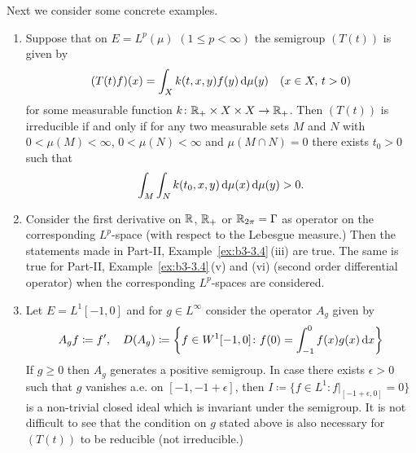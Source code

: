 Next we consider some concrete examples.
\begin{examples}\label{ex:c3-3.4}
	\begin{enumerate}[\upshape (i), wide, labelindent=.25em]
	\item 
	Suppose that on $E = L^{p}(\mu)$ $(1 \leq p < \infty)$ the semigroup $(T(t))$ is given by
	\begin{equation}\label{eq:c3-3.1}
		(T(t)f)(x) = \int_{X} k(t,x,y)f(y) \mathop{}\!\mathrm{d}{\mu}(y) \quad (x \in X,\, t > 0)
	\end{equation}
	for some measurable function $k \colon \mathbb{R} _{+} \times X \times X \to \mathbb{R} _{+}$.
	Then $(T(t))$ is irreducible if and only if for any two measurable sets $M$ and $N$ with $0 < \mu(M) < \infty$, $0 < \mu(N) < \infty$ and $\mu(M\cap N) = 0$ there exists $t_{0} > 0$ such that 
\[
	\int_{M}\int_{N} k(t_{0},x,y)\mathop{}\!\mathrm{d}{\mu}(x)\mathop{}\!\mathrm{d}{\mu}(y) > 0 .
\]
%
	\item 
	Consider the first derivative on $\mathbb{R} $, $\mathbb{R} _{+}$ or $\mathbb{R} _{2\pi} = \Gamma$ as operator on the corresponding $L^{p}$-space (with respect to the Lebesgue measure.)
	Then the statements made in Part-II, Example~\ref{ex:b3-3.4}\,(iii) are true.
	The same is true for Part-II, Example~\ref{ex:b3-3.4}\,(v) and (vi) (second order differential operator) when the corresponding $L^{p}$-spaces are considered.
	
	\item 
	Let $E = L^{1}[-1,0]$ and for $g \in L^{\infty}$ consider the operator $A_{g}$ given by
	\begin{equation}\label{eq:c3-3.2}
		A_{g}f \coloneq f', \quad 
		D(A_{g}) \coloneq \mleft\{f \in W^{1}[-1,0] \colon f(0) = \int_{-1}^{0} f(x)g(x)\dx \mright\}
	\end{equation}
	If\/ $g \geq 0$ then $A_{g}$ generates a positive semigroup.
	In case there exists $\epsilon > 0$ such that $g$ vanishes a.e. on $[-1,-1+\epsilon]$, then $I \coloneq \{f \in L^{1} \colon f|_{[-1+\epsilon,0]} = 0\}$ is a non-trivial closed ideal which is invariant under the semigroup.
	It is not difficult to see that the condition on $g$ stated above is also necessary for $(T(t))$ to be reducible (\ie  not irreducible.)


\end{enumerate}
\end{examples}
